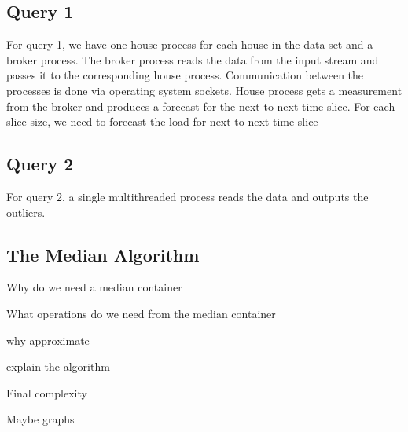 \subsection{Query 1}
For query 1, we have one house process for each house in the data set and a broker process. The broker process reads the data from the input stream and passes it to the corresponding house process. Communication between the processes is done via operating system sockets. House process gets a measurement from the broker and produces a forecast for the next to next time slice. 
For each slice size, we need to forecast the load for next to next time slice 
\subsection{Query 2}
For query 2, a single multithreaded process reads the data and outputs the outliers. 
\subsection{The Median Algorithm}
Why do we need a median container

What operations do we need from the median container

why approximate

explain the algorithm

Final complexity

Maybe graphs

